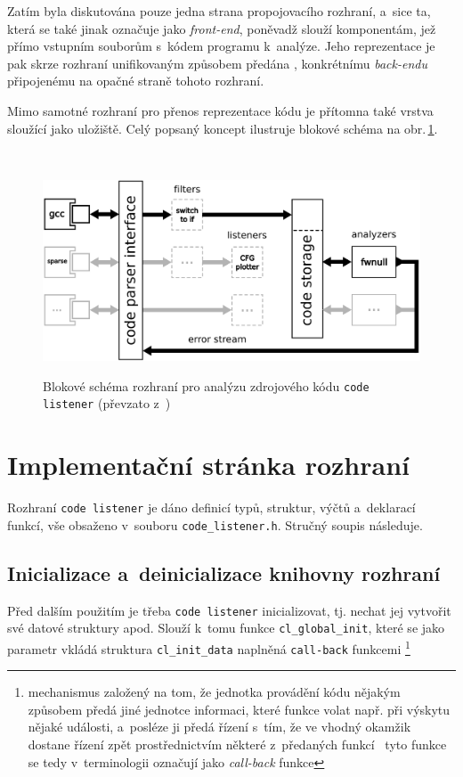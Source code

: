 Zatím byla diskutována pouze jedna strana propojovacího rozhraní, a~sice
ta, která se také jinak označuje jako \emph{front-end}, poněvadž slouží
komponentám, jež přímo  vstupním souborům s~kódem programu
k~analýze. Jeho reprezentace je pak skrze rozhraní unifikovaným způsobem
předána , konkrétnímu \emph{back-endu} připojenému na opačné straně
tohoto rozhraní.

Mimo samotné rozhraní pro přenos reprezentace kódu je přítomna
také vrstva sloužící jako uložiště. Celý popsaný koncept ilustruje
blokové schéma na obr.\,\ref{fig:code-listener:api}.

\hspace*{\fill}\\[-\baselineskip]
\begin{figure}[!h]
    \begin{center}
        \includegraphics[width=1\textwidth,keepaspectratio]{fig/cl-block-diagram}
        \label{fig:code-listener:api}
        \caption{Blokové schéma rozhraní pro analýzu zdrojového kódu
                 \texttt{code listener} (převzato z~\cite{web:FITVUTBR:VeriFIT:CodeListener})}
    \end{center}
\end{figure}


\section{Implementační stránka rozhraní}

Rozhraní \texttt{code listener} je dáno definicí typů, struktur,
výčtů a~deklarací funkcí, vše obsaženo v~souboru \texttt{code\_listener.h}.
Stručný soupis následuje.

\subsection{Inicializace a~deinicializace knihovny rozhraní}
Před dalším použitím je třeba \texttt{code listener} inicializovat,
tj. nechat jej vytvořit své datové struktury apod. Slouží
k~tomu funkce \texttt{cl\_global\_init}, které se jako parametr
vkládá struktura \texttt{cl\_init\_data} naplněná \texttt{call-back}
funkcemi%
%
\footnote{mechanismus založený na tom, že jednotka provádění kódu
nějakým způsobem předá jiné jednotce informaci, které funkce
volat např. při výskytu nějaké události, a~posléze ji předá řízení
s~tím, že ve vhodný okamžik dostane řízení zpět prostřednictvím
některé z~předaných funkcí \ndash\ tyto funkce 
se tedy v~terminologii označují jako \emph{call-back} funkce}%
%

